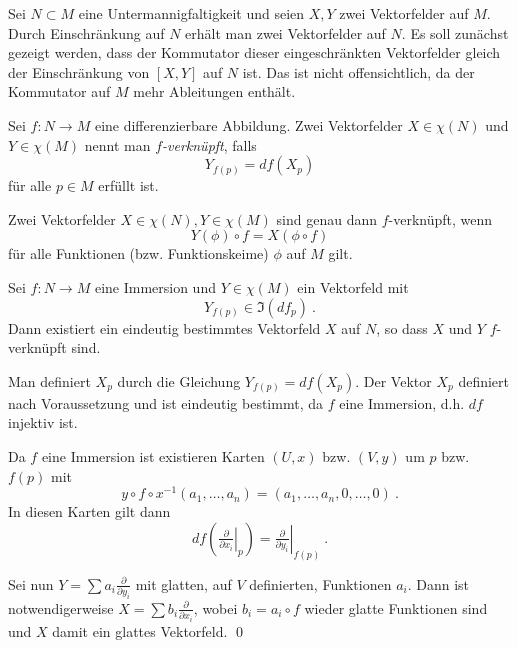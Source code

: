 \documentclass[%
	paper=a5,%
	fleqn,%
	DIV=18,%
	BCOR=0mm,
	fontsize=11pt,
	titlepage=false,%
	bibliography=totoc,
	DIV=18,%
	twoside=true,
	pdftitle=Riemannsche Geometrie,
	pdfauthor=Uwe Semmelmann,
	numbers=noendperiod]%
	{scrbook}
\begin{document}
Sei $N \subset M$ eine Untermannigfaltigkeit und seien $X, Y$ zwei Vektorfelder auf $M$. Durch Einschr\"ankung
auf $N$ erh\"alt man zwei Vektorfelder auf $N$. Es soll zun\"achst gezeigt werden, dass der Kommutator dieser
eingeschr\"ankten Vektorfelder gleich der Einschr\"ankung von $[X,Y]$ auf $N$ ist. Das ist nicht offensichtlich,
da der Kommutator auf $M$ mehr Ableitungen enth\"alt.

\bigskip

\begin{Definition}
Sei $f:N\rightarrow M$ eine differenzierbare Abbildung.  Zwei Vektorfelder $X\in \chi(N)$ und $Y\in \chi(M)$
nennt man \emph{ $f$-verkn\"upft}, falls
$$
Y_{f(p)} = df (X_p)
$$
f\"ur alle $p\in M$ erf\"ullt ist.\fish
\end{Definition}

\bigskip

\begin{rem*} Zwei Vektorfelder $X \in \chi(N),  Y\in \chi(M)$ sind genau dann $f$-verkn\"upft, wenn
$$
Y(\phi) \circ f = X(\phi \circ f)
$$
f\"ur alle Funktionen (bzw. Funktionskeime) $\phi$ auf $M$ gilt.
\end{rem*}

\bigskip

\begin{Lemma}
Sei $f: N \rightarrow M $ eine Immersion und $Y\in \chi(M)$ ein Vektorfeld mit
$$
Y_{f(p)} \in \Im (df_p) \ .
$$
Dann existiert ein eindeutig bestimmtes Vektorfeld $X$ auf $N$, so dass $X$ und $Y$
$f$-verkn\"upft sind.\fish
\end{Lemma}
\proof
Man definiert $X_p$ durch die Gleichung $Y_{f(p)}=df (X_p)$. Der Vektor $X_p$ definiert nach
Voraussetzung und ist eindeutig bestimmt, da $f$ eine Immersion, d.h. $df$ injektiv ist.

\medskip

Da $f$ eine Immersion ist existieren Karten $(U,x)$ bzw. $(V,y)$ um $p$ bzw. $f(p)$ mit
$$
y\circ f \circ x^{-1}(a_1,\ldots,a_n) = (a_1,\ldots, a_n,0,\ldots, 0) \ .
$$
In diesen Karten gilt dann
$$
df (\left. \tfrac{\partial}{\partial x_i}\right|_p) = \left. \tfrac{\partial}{\partial y_i}\right|_{f(p)} \ .
$$

Sei nun $Y = \sum a_i \tfrac{\partial}{\partial y_i}$ mit glatten, auf $V$ definierten, Funktionen $a_i$. Dann ist
notwendigerweise $X = \sum b_i \tfrac{\partial}{\partial x_i}$, wobei $b_i = a_i \circ f$ wieder glatte Funktionen sind
und $X$ damit ein glattes Vektorfeld.
\qed

\bigskip
\end{document}
